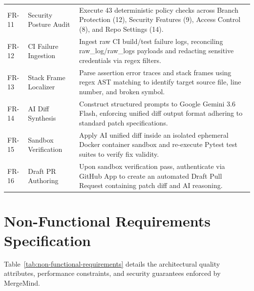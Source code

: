 \begin{longtable}{p{} p{} p{}}
\addlinespace
FR-11 & Security Posture Audit & Execute 43 deterministic policy checks across Branch Protection (12), Security Features (9), Access Control (8), and Repo Settings (14). \\
\addlinespace
FR-12 & CI Failure Ingestion & Ingest raw CI build/test failure logs, reconciling raw\_log/raw\_logs payloads and redacting sensitive credentials via regex filters. \\
\addlinespace
FR-13 & Stack Frame Localizer & Parse assertion error traces and stack frames using regex AST matching to identify target source file, line number, and broken symbol. \\
\addlinespace
FR-14 & AI Diff Synthesis & Construct structured prompts to Google Gemini 3.6 Flash, enforcing unified diff output format adhering to standard patch specifications. \\
\addlinespace
FR-15 & Sandbox Verification & Apply AI unified diff inside an isolated ephemeral Docker container sandbox and re-execute Pytest test suites to verify fix validity. \\
\addlinespace
FR-16 & Draft PR Authoring & Upon sandbox verification pass, authenticate via GitHub App to create an automated Draft Pull Request containing patch diff and AI reasoning. \\
\end{longtable}

\section{Non-Functional Requirements Specification}
\label{sec:non-functional-reqs}

Table~\ref{tab:non-functional-requirements} details the architectural quality attributes, performance constraints, and security guarantees enforced by MergeMind.


